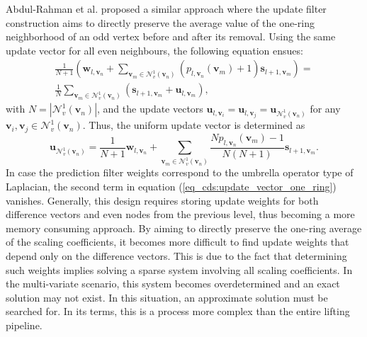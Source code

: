\documentclass[graybox]{svmult}
\begin{document}
	Abdul-Rahman et al. \cite{AbdulRahman2013} proposed a similar approach where the update filter construction aims to directly preserve the average value of the one-ring neighborhood of an odd vertex before and after its removal. Using the same update vector for all even neighbours, the following equation ensues:
	\begin{eqnarray}
	\frac{1}{ N + 1} \left( \mathbf{w}_{l, \mathbf{v}_n} + \sum\limits_{\mathbf{v}_m \in \mathcal{N}_v^1(\mathbf{v}_n) } { (  p_{l, \mathbf{v}_n}(\mathbf{v}_m) + 1 ) \mathbf{s}_{l+1, \mathbf{v}_m} } \right) = \\ \frac{1}{N} \sum\limits_{\mathbf{v}_m \in \mathcal{N}_v^1(\mathbf{v}_n) } { (  \mathbf{s}_{l+1, \mathbf{v}_m} + \mathbf{u}_{l,\mathbf{v}_m} ) } ,
	\label{eq_cds:one_ring_average}
	\end{eqnarray}
	with $N = | \mathcal{N}_v^1(\mathbf{v}_n) |$, and the update vectors $\mathbf{u}_{l,\mathbf{v}_i} = \mathbf{u}_{l,\mathbf{v}_j} = \mathbf{u}_{\mathcal{N}_v^1(\mathbf{v}_n)} $ for any $\mathbf{v}_i, \mathbf{v}_j \in \mathcal{N}_v^1(\mathbf{v}_n)$. Thus, the uniform update vector is determined as
	\begin{equation}
	\mathbf{ u}_{\mathcal{N}_v^1(\mathbf{v}_n)} = \frac{1}{N + 1} \mathbf{w}_{l, \mathbf{v}_n}  + \sum\limits_{\mathbf{v}_m \in \mathcal{N}_v^1(\mathbf{v}_n) } { \frac{ N  p_{l, \mathbf{v}_n}(\mathbf{v}_m) - 1 }{N (N +1 ) } \mathbf{s}_{l+1, \mathbf{v}_m} }.
	\label{eq_cds:update_vector_one_ring}
	\end{equation}
	In case the prediction filter weights correspond to the umbrella operator type of Laplacian, the second term in equation (\ref{eq_cds:update_vector_one_ring}) vanishes. Generally, this design requires storing update weights for both difference vectors and even nodes from the previous level, thus becoming a more memory consuming approach.
	By aiming to directly preserve the one-ring average of the scaling coefficients, it becomes more difficult to find update weights that depend only on the difference vectors. This is due to the fact that determining such weights implies solving a sparse system involving all scaling coefficients. In the multi-variate scenario, this system becomes overdetermined and an exact solution may not exist. In this situation, an approximate solution must be searched for. In its terms, this is a process more complex than the entire lifting pipeline.
	
\end{document}
